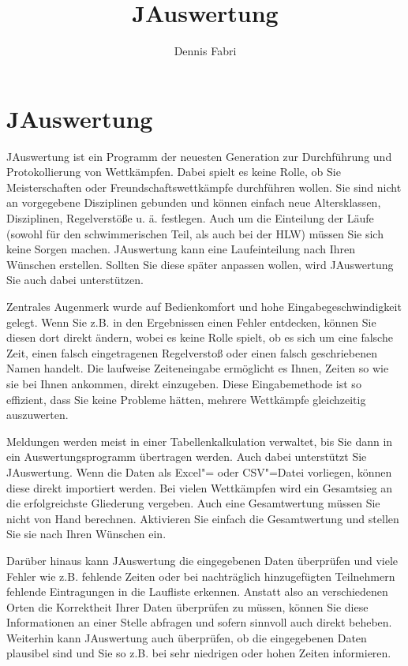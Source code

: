 \documentclass[11pt,a4paper,twoside,ngerman]{article}
\title{JAuswertung}
\author{Dennis Fabri}
\begin{document}
\maketitle
\tableofcontents
\newpage

\section*{JAuswertung}
JAuswertung ist ein Programm der neuesten Generation zur Durchführung und Protokollierung von Wettkämpfen. Dabei spielt es keine Rolle, ob Sie Meisterschaften oder Freundschaftswettkämpfe durchführen wollen. Sie sind nicht an vorgegebene Disziplinen gebunden und können einfach neue Altersklassen, Disziplinen, Regelverstöße u. ä. festlegen. Auch um die Einteilung der Läufe (sowohl für den schwimmerischen Teil, als auch bei der HLW) müssen Sie sich keine Sorgen machen. JAuswertung kann eine Laufeinteilung nach Ihren Wünschen erstellen. Sollten Sie diese später anpassen wollen, wird JAuswertung Sie auch dabei unterstützen. 

Zentrales Augenmerk wurde auf Bedienkomfort und hohe Eingabegeschwindigkeit gelegt. Wenn Sie z.B. in den Ergebnissen einen Fehler entdecken, können Sie diesen dort direkt ändern, wobei es keine Rolle spielt, ob es sich um eine falsche Zeit, einen falsch eingetragenen Regelverstoß oder einen falsch geschriebenen Namen handelt. Die laufweise Zeiteneingabe ermöglicht es Ihnen, Zeiten so wie sie bei Ihnen ankommen, direkt einzugeben. Diese Eingabemethode ist so effizient, dass Sie keine Probleme hätten, mehrere Wettkämpfe gleichzeitig auszuwerten.

Meldungen werden meist in einer Tabellenkalkulation verwaltet, bis Sie dann in ein Auswertungsprogramm übertragen werden. Auch dabei unterstützt Sie JAuswertung. Wenn die Daten als Excel"= oder CSV"=Datei vorliegen, können diese direkt importiert werden. Bei vielen Wettkämpfen wird ein Gesamtsieg an die erfolgreichste Gliederung vergeben. Auch eine Gesamtwertung müssen Sie nicht von Hand berechnen. Aktivieren Sie einfach die Gesamtwertung und stellen Sie sie nach Ihren Wünschen ein.

Darüber hinaus kann JAuswertung die eingegebenen Daten überprüfen und viele Fehler wie z.B. fehlende Zeiten oder bei nachträglich hinzugefügten Teilnehmern fehlende Eintragungen in die Laufliste erkennen. Anstatt also an verschiedenen Orten die Korrektheit Ihrer Daten überprüfen zu müssen, können Sie diese Informationen an einer Stelle abfragen und sofern sinnvoll auch direkt beheben. Weiterhin kann JAuswertung auch überprüfen, ob die eingegebenen Daten plausibel sind und Sie so z.B. bei sehr niedrigen oder hohen Zeiten informieren.
\end{document}
